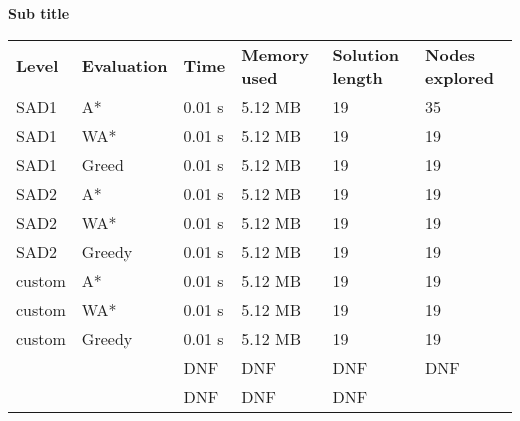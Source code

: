 \documentclass[Main]{subfiles}
\begin{document}
\textbf{Sub title}



\begin{table}[h]
\begin{tabular}{llllll}
\rowcolor[HTML]{EFEFEF} 
\textbf{Level} & \textbf{Evaluation} & \textbf{Time} & \textbf{Memory used} & \textbf{Solution length} & \textbf{Nodes explored} \\
SAD1           & A*                  & 0.01 s        & 5.12 MB              & 19                       & 35                      \\
SAD1           & WA*                 & 0.01 s        & 5.12 MB              & 19                       & 19                      \\
SAD1           & Greed               & 0.01 s        & 5.12 MB              & 19                       & 19                      \\
SAD2           & A*                  & 0.01 s        & 5.12 MB              & 19                       & 19                      \\
SAD2           & WA*                 & 0.01 s        & 5.12 MB              & 19                       & 19                      \\
SAD2           & Greedy              & 0.01 s        & 5.12 MB              & 19                       & 19                      \\
custom         & A*                  & 0.01 s        & 5.12 MB              & 19                       & 19                      \\
custom         & WA*                 & 0.01 s        & 5.12 MB              & 19                       & 19                      \\
custom         & Greedy              & 0.01 s        & 5.12 MB              & 19                       & 19                      \\
               &                     & DNF           & DNF                  & DNF                      & DNF                     \\
               &                     & DNF           & DNF                  & DNF                      &                        
\end{tabular}
\end{table}
\end{document}
